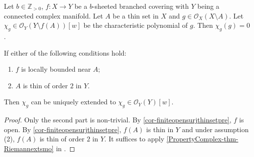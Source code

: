 \begin{proposition}\label{prop-charpoly}
    Let $b\in \mathbb{Z}_{>0}$, $f:X\rightarrow Y$ be a $b$-sheeted branched covering with $Y$ being a connected complex manifold. Let $A$ be a thin set in $X$ and $g\in \mathcal{O}_X(X\setminus A)$. Let $\chi_g\in \mathcal{O}_Y(Y\setminus f(A))[w]$ be the characteristic polynomial of $g$. Then $\chi_g(g)=0$.

    If either of the following conditions hold:
    \begin{enumerate}
        \item $f$ is locally bounded near $A$;
        \item $A$ is thin of order $2$ in $Y$.
    \end{enumerate}
    Then $\chi_g$ can be uniquely extended to $\chi_g\in \mathcal{O}_Y(Y)[w]$.
\end{proposition}
\begin{proof}
    Only the second part is non-trivial. By \cref{cor-finiteopensurjthinsetpre}, $f$ is open. 
    By \cref{cor-finiteopensurjthinsetpre}, $f(A)$ is thin in $Y$ and under assumption (2), $f(A)$ is thin of order $2$ in $Y$. It suffices to apply \cref{PropertyComplex-thm-Riemannextsmo} in .
\end{proof}

